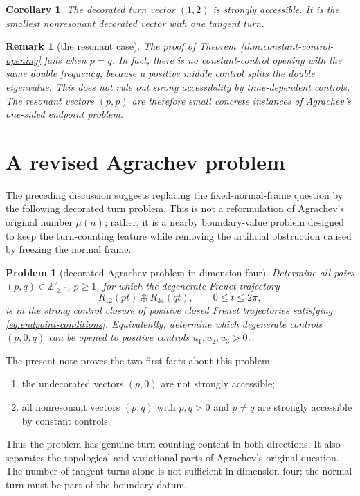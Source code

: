 \documentclass[10pt,a4paper]{amsart}
\newtheorem{corollary}[theorem]{Corollary}
\newtheorem{problem}[theorem]{Problem}
\newtheorem{remark}[theorem]{Remark}
\begin{document}
\begin{corollary}\label{cor:first-one-turn}
The decorated turn vector $(1,2)$ is strongly accessible.  It is the smallest
nonresonant decorated vector with one tangent turn.
\end{corollary}

\begin{remark}[the resonant case]\label{rem:resonance}
The proof of Theorem~\ref{thm:constant-control-opening} fails when $p=q$.  In fact,
there is no constant-control opening with the same double frequency, because a
positive middle control splits the double eigenvalue.  This does not rule out
strong accessibility by time-dependent controls.  The resonant vectors $(p,p)$ are
therefore small concrete instances of Agrachev's one-sided endpoint problem.
\end{remark}

\section{A revised Agrachev problem}

The preceding discussion suggests replacing the fixed-normal-frame question by the
following decorated turn problem.  This is not a reformulation of Agrachev's original
number $\mu(n)$; rather, it is a nearby boundary-value problem designed to keep the
turn-counting feature while removing the artificial obstruction caused by freezing
the normal frame.

\begin{problem}[decorated Agrachev problem in dimension four]\label{prob:decorated-R4}
Determine all pairs $(p,q)\in\mathbb Z_{\ge0}^2$, $p\ge1$, for which the degenerate
Frenet trajectory
\[
        R_{12}(pt)\oplus R_{34}(qt),
        \qquad 0\le t\le2\pi,
\]
is in the strong control closure of positive closed Frenet trajectories satisfying
\eqref{eq:endpoint-conditions}.  Equivalently, determine which degenerate controls
$(p,0,q)$ can be opened to positive controls $u_1,u_2,u_3>0$.
\end{problem}

The present note proves the two first facts about this problem:
\begin{enumerate}[label=\textup{(\roman*)}]
\item the undecorated vectors $(p,0)$ are not strongly accessible;
\item all nonresonant vectors $(p,q)$ with $p,q>0$ and $p\ne q$ are strongly
accessible by constant controls.
\end{enumerate}
Thus the problem has genuine turn-counting content in both directions.  It also
separates the topological and variational parts of Agrachev's original question.  The
number of tangent turns alone is not sufficient in dimension four; the normal turn
must be part of the boundary datum.
\end{document}
